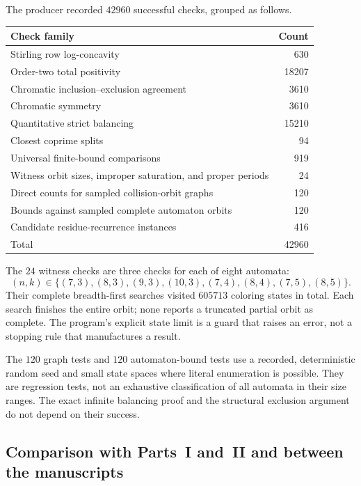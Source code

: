 \documentclass[11pt,a4paper]{article}
\numberwithin{equation}{section}
\theoremstyle{definition}
\theoremstyle{remark}
\begin{document}
The producer recorded $42960$ successful checks, grouped as follows.
\begin{center}
\small
\begin{tabular}{@{}lr@{}}
\toprule
Check family & Count\\
\midrule
Stirling row log-concavity & 630\\
Order-two total positivity & 18207\\
Chromatic inclusion--exclusion agreement & 3610\\
Chromatic symmetry & 3610\\
Quantitative strict balancing & 15210\\
Closest coprime splits & 94\\
Universal finite-bound comparisons & 919\\
Witness orbit sizes, improper saturation, and proper periods & 24\\
Direct counts for sampled collision-orbit graphs & 120\\
Bounds against sampled complete automaton orbits & 120\\
Candidate residue-recurrence instances & 416\\
\midrule
Total & 42960\\
\bottomrule
\end{tabular}
\end{center}
The $24$ witness checks are three checks for each of eight automata:
\[
 (n,k)\in\{(7,3),(8,3),(9,3),(10,3),(7,4),(8,4),(7,5),(8,5)\}.
\]
Their complete breadth-first searches visited $605713$ coloring states in
total. Each search finishes the entire orbit; none reports a truncated partial
orbit as complete. The program's explicit state limit is a guard that raises
an error, not a stopping rule that manufactures a result.

The $120$ graph tests and $120$ automaton-bound tests use a recorded,
deterministic random seed and small state spaces where literal enumeration is
possible. They are regression tests, not an exhaustive classification of all
automata in their size ranges. The exact infinite balancing proof and the
structural exclusion argument do not depend on their success.

\subsection{Comparison with Parts~I and~II and between the manuscripts}\label{evo:sec:rowcheck}
\end{document}
